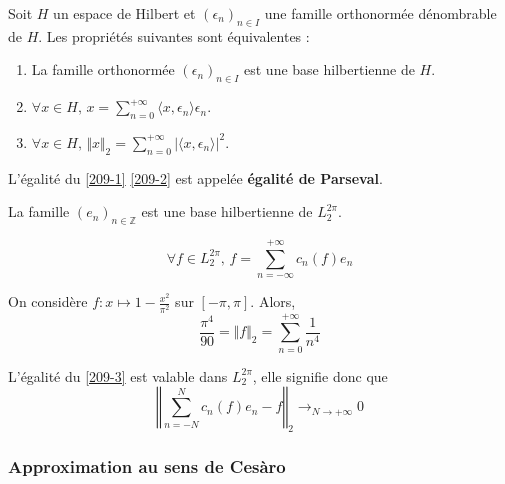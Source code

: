 
  \begin{theorem}
    \label{209-2}
    Soit $H$ un espace de Hilbert et $(\epsilon_n)_{n \in I}$ une famille orthonormée dénombrable de $H$. Les propriétés suivantes sont équivalentes :
    \begin{enumerate}[label=(\roman*)]
      \item La famille orthonormée $(\epsilon_n)_{n \in I}$ est une base hilbertienne de $H$.
      \item $\forall x \in H, \, x = \sum_{n=0}^{+\infty} \langle x, \epsilon_n \rangle \epsilon_n$.
      \item \label{209-3} $\forall x \in H, \, \Vert x \Vert_2 = \sum_{n=0}^{+\infty} \vert \langle x, \epsilon_n \rangle \vert^2$.
    \end{enumerate}
  \end{theorem}

  \begin{remark}
    L'égalité du \cref{209-1} \cref{209-2} est appelée \textbf{égalité de Parseval}.
  \end{remark}


  \begin{theorem}
    La famille $(e_n)_{n \in \mathbb{Z}}$ est une base hilbertienne de $L_2^{2 \pi}$.
  \end{theorem}

  \begin{corollary}
    \label{209-4}
    \[ \forall f \in L_2^{2 \pi}, \, f = \sum_{n = -\infty}^{+\infty} c_n(f) e_n \]
  \end{corollary}


  \begin{example}
    On considère $f : x \mapsto 1 - \frac{x^2}{\pi^2}$ sur $[-\pi, \pi]$. Alors,
    \[ \frac{\pi^4}{90} = \Vert f \Vert_2 = \sum_{n=0}^{+\infty} \frac{1}{n^4} \]
  \end{example}


  \begin{remark}
    L'égalité du \cref{209-3} est valable dans $L_2^{2\pi}$, elle signifie donc que
    \[ \left\Vert \sum_{n = -N}^{N} c_n(f) e_n - f \right\Vert_2 \longrightarrow_{N \rightarrow +\infty} 0 \]
  \end{remark}

  \subsubsection{Approximation au sens de Cesàro}

